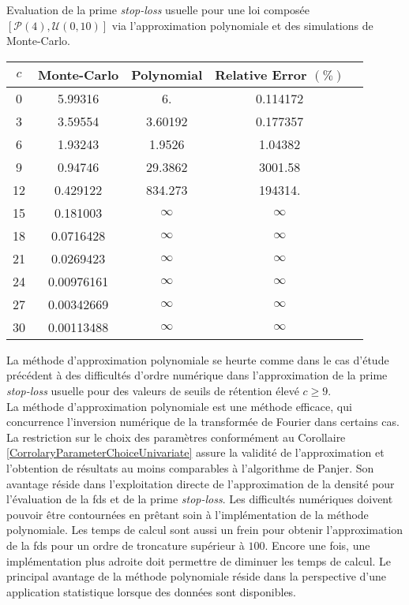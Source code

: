 	\begin{tableth}
		\caption[Calcul de la prime \textit{stop-loss} pour une loi $\left(\mathcal{P}(4),\mathcal{U}(0,10)\right)$]{Evaluation de la prime \textit{stop-loss} usuelle pour une loi composée $\left[\mathcal{P}(4),\mathcal{U}(0,10)\right]$ via l'approximation polynomiale et des simulations de Monte-Carlo.}
			\label{TableStopLossPolynomialCompoundPoissonUniform}
		\begin{tabular}{|c||c|c|c|c|}
\hline
$c$ & Monte-Carlo & Polynomial & Relative Error $(\%)$\\
\hline
\hline
0 & 5.99316 & 6. & 0.114172 \\
 3 & 3.59554 & 3.60192 & 0.177357 \\
 6 & 1.93243 & 1.9526 & 1.04382 \\
 9 & 0.94746 & 29.3862 & 3001.58 \\
 12 & 0.429122 & 834.273 & 194314. \\
 15 & 0.181003 & $\infty$ & $\infty$ \\
 18 & 0.0716428 & $\infty$ & $\infty$ \\
 21 & 0.0269423 & $\infty$ & $\infty$ \\
 24 & 0.00976161 & $\infty$ & $\infty$ \\
 27 & 0.00342669 & $\infty$ & $\infty$ \\
 30 & 0.00113488 & $\infty$ & $\infty$ \\
\hline
		\end{tabular}
	\end{tableth}

La méthode d\rq{}approximation polynomiale se heurte comme dans le cas d\rq{}étude précédent à des difficultés d\rq{}ordre numérique dans l\rq{}approximation de la prime \textit{stop-loss} usuelle pour des valeurs de seuils de rétention élevé $c\geq9$.\\

La méthode d\rq{}approximation polynomiale est une méthode efficace, qui concurrence l\rq{}inversion numérique de la transformée de Fourier dans certains cas. La restriction sur le choix des paramètres conformément au Corollaire \ref{CorrolaryParameterChoiceUnivariate} assure la validité de l\rq{}approximation et l\rq{}obtention de résultats au moins comparables à l\rq{}algorithme de Panjer. Son avantage réside dans l\rq{}exploitation directe de l\rq{}approximation de la densité pour l\rq{}évaluation de la \gls{fds} et de la prime \textit{stop-loss}. Les difficultés numériques doivent pouvoir être contournées en prêtant soin à l\rq{}implémentation de la méthode polynomiale. Les temps de calcul sont aussi un frein pour obtenir l\rq{}approximation de la \gls{fds} pour un ordre de troncature supérieur à $100$. Encore une fois, une implémentation plus adroite doit permettre de diminuer les temps de calcul. Le principal avantage de la méthode polynomiale réside dans la perspective d\rq{}une application statistique lorsque des données sont disponibles.     

